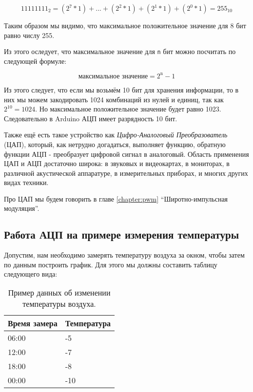 \documentclass[../sparc.tex]{subfiles}
\begin{document}
\begin{equation}
  11111111_2 = (2^7 * 1) + \mbox{...} + (2^2 * 1) + (2^1 * 1) + (2^0 * 1) = 255_{10}
\end{equation}

Таким образом мы видимо, что максимальное положительное значение для 8 бит равно
числу 255.

Из этого оследует, что максимальное значение для \texttt{n} бит можно посчитать
по следующей формуле:

\begin{equation}
  \mbox{максимальное значение} = 2^{\mbox{n}} - 1
\end{equation}

Из этого следует, что если мы возьмём 10 бит для хранения информации, то в них
мы можем закодировать 1024 комбинаций из нулей и единиц, так как $2^{10} =
1024$.  Но максимальное положительное значение будет равно 1023.  Следовательно
в Arduino АЦП имеет разрядность 10 бит.

Также ещё есть такое устройство как \emph{Цифро-Аналоговый Преобразователь}
(\gls{ЦАП}), который, как нетрудно догадаться, выполняет функцию, обратную
функции АЦП - преобразует цифровой сигнал в аналоговый.  Область применения ЦАП
и АЦП достаточно широка: в звуковых и видеокартах, в мониторах, в различной
акустической аппаратуре, в измерительных приборах, и многих других видах
техники.

Про ЦАП мы будем говорить в главе \ref{chapter:pwm} ``Широтно-импульсная
модуляция''.

\subsection{Работа АЦП на примере измерения температуры}
\label{subsection:adc-temperature-example}

Допустим, нам необходимо замерять температуру воздуха за окном, чтобы затем по
данным построить график.  Для этого мы должны составить таблицу следующего вида:

\begin{table}[h]
  \centering
  \begin{tabular}{p{3cm}|p{4cm}}
    Время замера & Температура \\
    \hline \hline
    06:00 & -5 \\
    \hline
    12:00 & -7 \\
    \hline
    18:00 & -8 \\
    \hline
    00:00 & -10 \\
    \hline
  \end{tabular}
  \caption{Пример данных об изменении температуры воздуха.}
  \label{table:adc-temperature-data-example-1}
\end{table}
\end{document}
